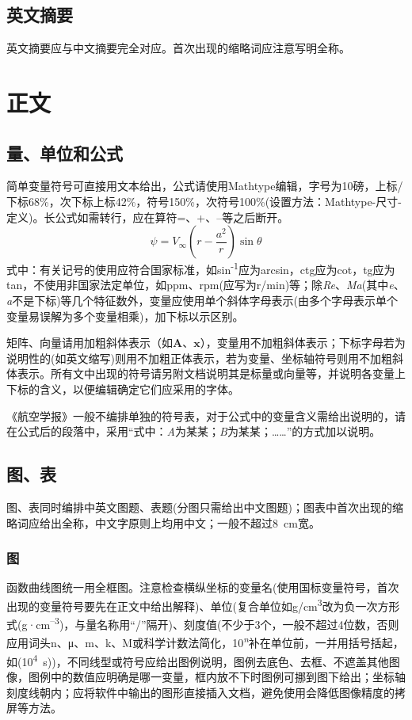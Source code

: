 \documentclass{aaas}
\newcommand\mycolorRed[1]{{\color{red}#1}}
\begin{document}
\subsection{英文摘要}
英文摘要\mycolorRed{应与中文摘要完全对应}。首次出现的缩略词应注意写明全称。

\section{正\hspace{1em}文}
\subsection{量、单位和公式}
\label{labSecForm}
简单变量符号可直接用文本给出，公式请使用Mathtype编辑，字号为10磅，上标/下标68\%，次下标上标42\%，符号150\%，次符号100\%(设置方法：Mathtype-尺寸-定义)。长公式如需转行，应在算符=、+、–等之后断开。
\begin{equation}
\label{eqnPsi}
\psi = V_{\infty}\left(r-\frac{a^2}{r}\right)\sin\theta
\end{equation}
\noindent 式中：有关记号的使用应符合国家标准，如sin\textsuperscript{-1}应为arcsin，ctg应为cot，tg应为tan，不使用非国家法定单位，如ppm、rpm(应写为r/min)等；除\textit{Re}、\textit{Ma}(其中\textit{e}、\textit{a}不是下标)等几个特征数外，\mycolorRed{变量应使用单个斜体字母表示}(由多个字母表示单个变量易误解为多个变量相乘)，\mycolorRed{加下标以示区别}。

\mycolorRed{矩阵、向量}请用\mycolorRed{加粗斜体}表示（如$\bm{A}$、$\bm{x}$），\mycolorRed{变量}用不加粗\mycolorRed{斜体}表示；\mycolorRed{下标字母}若为说明性的(如英文缩写)则用不加粗\mycolorRed{正体}表示，若为变量、坐标轴符号则用不加粗\mycolorRed{斜体}表示。所有文中出现的符号请另附文档说明其是标量或向量等，并说明各变量上下标的含义，以便编辑确定它们应采用的字体。

《航空学报》一般不编排单独的符号表，对于公式中的变量含义需给出说明的，请在公式后的段落中，采用“\mycolorRed{式中：}\textit{A}为某某\mycolorRed{；}\textit{B}为某某\mycolorRed{；}……”的方式加以说明。

\subsection{图、表}
图、表同时编排中英文图题、表题(分图只需给出中文图题)；图表中首次出现的缩略词应给出全称，\mycolorRed{中文字原则上均用中文}；一般不超过8~cm宽。

\subsubsection{图}
函数曲线图统一用\mycolorRed{全框图}。\mycolorRed{注意检查横纵坐标的变量名}(使用国标变量符号，首次出现的变量符号要先在正文中给出解释)、\mycolorRed{单位}(复合单位如g/cm\textsuperscript{3}改为负一次方形式(g·cm\textsuperscript{–3})，与量名称用“/”隔开)、\mycolorRed{刻度值}(不少于3个，一般不超过4位数，否则应用词头n、μ、m、k、M或科学计数法简化，10\textsuperscript{\textit{n}}补在单位前，一并用括号括起，如(10\textsuperscript{4}~s))，不同线型或符号应给出图例说明，图例去底色、去框、不遮盖其他图像，图例中的数值应明确是哪一变量，框内放不下时图例可挪到图下给出；坐标轴刻度线朝内；应将软件中输出的图形直接插入文档，避免使用会降低图像精度的拷屏等方法。
\end{document}
